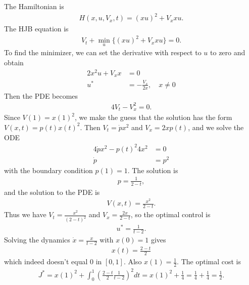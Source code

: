\documentclass[12pt]{article}
\begin{document}
\begin{problem}[6]
The Hamiltonian is
\begin{align*}
	H(x,u,V_x,t) = (xu)^2 + V_x xu .
\end{align*}
The HJB equation is
\begin{align*}
	V_t + \min_u \{(xu)^2 + V_x xu\} =0.
\end{align*}
To find the minimizer, we can set the derivative with respect to $ u$ to zero and obtain
 \begin{align*}
	2x^2 u + V_x x &= 0 \\
	u^* &= - \frac{V_x}{ 2x} ,\quad  x \neq 0
\end{align*}
Then the PDE becomes
\begin{align*}
	4 V_t - V_x^2 =0 . 
\end{align*}
Since $ V(1) = x(1)^2$, we make the guess that the solution has the form $ V(x,t) = p(t) x(t)^2$. Then $ V_t = \dot{p} x^2$ and $ V_x = 2x p(t)$, and we solve the ODE
 \begin{align*}
	4\dot{p}x^2 - p(t)^2 4 x^2 &= 0 \\
	\dot{p} &= p^2 
\end{align*}
with the boundary condition $ p(1) = 1$. The solution is
 \begin{align*}
	p = \frac{1}{2-t} ,
\end{align*}
and the solution to the PDE is
\begin{align*}
	V(x,t) = \frac{x^2}{ 2-t} .
\end{align*}
Thus we have $ V_t = \frac{x^2}{ (2-t)^2}$ and $ V_x = \frac{2x}{ 2-t}$, so the optimal control is 
\begin{align*}
	u^*  = \frac{1}{t-2}.
\end{align*}
Solving the dynamics $ \dot{x} = \frac{x}{t-2}$ with $ x(0)=1$ gives
 \begin{align*}
	x(t) = \frac{2-t}{ 2}
\end{align*}
which indeed doesn't equal 0 in $ [0,1]$. Also $ x(1) = \frac{1}{2}$. The optimal cost is
 \begin{align*}
	J^*  = x(1)^2 + \int_{ 0}^{ 1} \left( \frac{2-t}{ 2}  \frac{1}{t-2} \right)^2 dt = x(1)^2+\frac{1}{4} = \frac{1}{4} + \frac{1}{4} = \frac{1}{2}.
\end{align*}
\end{problem}
\end{document}
